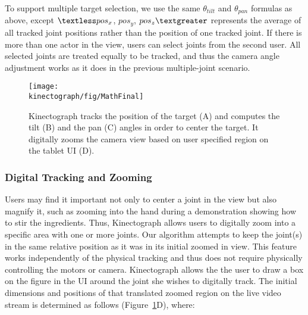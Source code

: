 To support multiple target selection, we use the same $\theta_{tilt}$ and $\theta_{pan}$ formulas as above, except $\textless pos_{x}$, $pos_{y}$, $pos_{z} \textgreater$ represents the average of all tracked joint positions rather than the position of one tracked joint.
%
If there is more than one actor in the view, users can select joints from the second user. All selected joints are treated equally to be tracked, and thus the camera angle adjustment works as it does in the previous multiple-joint scenario.


\begin{figure}[t]
\centering
\texttt{[image: \\kinectograph/fig/MathFinal]}
\caption{Kinectograph tracks the position of the target (A) and computes the tilt (B) and the pan (C) angles in order to center the target. It digitally zooms the camera view based on user specified region on the tablet UI (D).}
\label{fig:math}
\end{figure}

\subsubsection{Digital Tracking and Zooming}

Users may find it important not only to center a joint in the view but also magnify it, such as zooming into the hand during a demonstration showing how to stir the ingredients.
%
Thus, Kinectograph allows users to digitally zoom into a specific area with one or more joints. Our algorithm attempts to keep the joint(s) in the same relative position as it was in its initial zoomed in view. This feature works independently of the physical tracking and thus does not require physically controlling the motors or camera.
%
Kinectograph allows the the user to draw a box on the figure in the UI around the joint she wishes to digitally track. The initial dimensions and positions of that translated zoomed region on the live video stream is determined as follows (Figure~\ref{fig:math}D), where:

